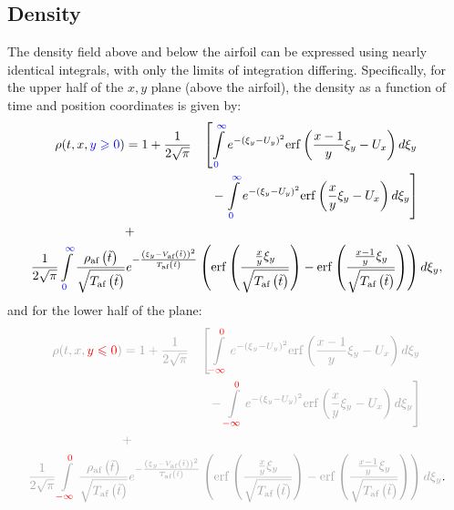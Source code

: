 \subsection{Density}
The density field above and below the airfoil can be expressed using nearly identical integrals, with only the limits of integration differing. Specifically, for the upper half of the $x,y$ plane (above the airfoil), the density as a function of time and position coordinates is given by:
\begin{gather*}
\begin{aligned}
\rho ( t,x,\textcolor[rgb]{0,0,1}{y\geqslant 0}) & =1+\frac{1}{2\sqrt{\pi }} & \left[\int\limits _{\textcolor[rgb]{0,0,1}{0}}^{\textcolor[rgb]{0,0,1}{\infty }} e^{-( \xi _{y} -U_{y})^{2}}\mathrm{erf}\left(\frac{x-1}{y} \xi _{y} -U_{x}\right) d\xi _{y}\right. \\
 &  & -\left. \int\limits _{\textcolor[rgb]{0,0,1}{0}}^{\textcolor[rgb]{0,0,1}{\infty }} e^{-( \xi _{y} -U_{y})^{2}}\mathrm{erf}\left(\frac{x}{y} \xi _{y} -U_{x}\right) d\xi _{y}\right]\\
 & + & 
\end{aligned}\\
\frac{1}{2\sqrt{\pi }}\int\limits _{\textcolor[rgb]{0,0,1}{0}}^{\textcolor[rgb]{0,0,1}{\infty }}\frac{\rho _{\text{af}}\left(\tilde{t}\right)}{\sqrt{T_{\text{af}}\left(\tilde{t}\right)}} e^{-\frac{\left( \xi _{y} -V_{\text{af}}\left(\tilde{t}\right)\right)^{2}}{T_{\text{af}}\left(\tilde{t}\right)}}\left(\mathrm{erf}\left(\frac{\frac{x}{y} \xi _{y}}{\sqrt{T_{\text{af}}\left(\tilde{t}\right)}}\right) -\mathrm{erf}\left(\frac{\frac{x-1}{y} \xi _{y}}{\sqrt{T_{\text{af}}\left(\tilde{t}\right)}}\right)\right) d\xi _{y}
,
\end{gather*}
and for the lower half of the plane:
\begin{gather*}
\textcolor[rgb]{0.65,0.65,0.65}{\begin{aligned}
\rho ( t,x,\textcolor[rgb]{1,0,0}{y\leqslant 0}) & =1+\frac{1}{2\sqrt{\pi }} & \left[\int\limits _{\textcolor[rgb]{1,0,0}{-\infty }}^{\textcolor[rgb]{1,0,0}{0}} e^{-( \xi _{y} -U_{y})^{2}}\mathrm{erf}\left(\frac{x-1}{y} \xi _{y} -U_{x}\right) d\xi _{y}\right. \\
 &  & -\left. \int\limits _{\textcolor[rgb]{1,0,0}{-\infty }}^{\textcolor[rgb]{1,0,0}{0}} e^{-( \xi _{y} -U_{y})^{2}}\mathrm{erf}\left(\frac{x}{y} \xi _{y} -U_{x}\right) d\xi _{y}\right]\\
 & + & 
\end{aligned}}\\
\textcolor[rgb]{0.65,0.65,0.65}{\frac{1}{2\sqrt{\pi }}\int\limits _{\textcolor[rgb]{1,0,0}{-\infty }}^{\textcolor[rgb]{1,0,0}{0}}\frac{\rho _{\text{af}}\left(\tilde{t}\right)}{\sqrt{T_{\text{af}}\left(\tilde{t}\right)}} e^{-\frac{\left( \xi _{y} -V_{\text{af}}\left(\tilde{t}\right)\right)^{2}}{T_{\text{af}}\left(\tilde{t}\right)}}\left(\mathrm{erf}\left(\frac{\frac{x}{y} \xi _{y}}{\sqrt{T_{\text{af}}\left(\tilde{t}\right)}}\right) -\mathrm{erf}\left(\frac{\frac{x-1}{y} \xi _{y}}{\sqrt{T_{\text{af}}\left(\tilde{t}\right)}}\right)\right) d\xi _{y}}
.
\end{gather*}
